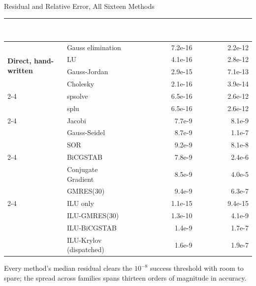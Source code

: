 \documentclass[aspectratio=169,10pt]{beamer}
\newcommand{\hdrow}{\rowcolor{LSnavy}}
\newcommand{\hdtxt}[1]{\textcolor{white}{\bfseries #1}}
\begin{document}
\begin{frame}{Residual and Relative Error, All Sixteen Methods}
  \begin{center}
  \tiny
  \renewcommand{\arraystretch}{0.98}
  \setlength{\tabcolsep}{4pt}
  \begin{tabular}{@{}p{1.85cm}p{2.55cm}rr@{}}
    \toprule
    \hdrow \hdtxt{Family} & \hdtxt{Method} & \hdtxt{Median rel.\ residual} & \hdtxt{Median rel.\ error}\\
    \midrule
    \multirow{4}{1.85cm}{\raggedright\bfseries\color{LSnavy}Direct, hand-written}
      & Gauss elimination & 7.2e-16 & 2.2e-12\\
      & LU & 4.1e-16 & 2.8e-12\\
      & Gauss-Jordan & 2.9e-15 & 7.1e-13\\
      & Cholesky & 2.1e-16 & 3.9e-14\\
    \cmidrule(lr){2-4}
    \multirow{2}{1.85cm}{\raggedright\bfseries\color{LSnavy}Direct, library}
      & spsolve & 6.5e-16 & 2.6e-12\\
      & splu & 6.5e-16 & 2.6e-12\\
    \cmidrule(lr){2-4}
    \multirow{3}{1.85cm}{\raggedright\bfseries\color{LSnavy}Stationary}
      & Jacobi & 7.7e-9 & 8.1e-9\\
      & Gauss-Seidel & 8.7e-9 & 1.1e-7\\
      & SOR & 9.2e-9 & 8.1e-8\\
    \cmidrule(lr){2-4}
    \multirow{3}{1.85cm}{\raggedright\bfseries\color{LSnavy}Krylov}
      & BiCGSTAB & 7.8e-9 & 2.4e-6\\
      & Conjugate Gradient & 8.5e-9 & 4.0e-5\\
      & GMRES(30) & 9.4e-9 & 6.3e-7\\
    \cmidrule(lr){2-4}
    \multirow{4}{1.85cm}{\raggedright\bfseries\color{LSnavy}Preconditioned (ILU)}
      & ILU only & 1.1e-15 & 9.4e-15\\
      & ILU-GMRES(30) & 1.3e-10 & 4.1e-9\\
      & ILU-BiCGSTAB & 1.4e-9 & 1.7e-7\\
      & ILU-Krylov (dispatched) & 1.6e-9 & 1.9e-7\\
    \bottomrule
  \end{tabular}
  \end{center}
  \vspace{0.1em}
  \footnotesize\color{LSgray}\centering
  Every method's median residual clears the $10^{-8}$ success threshold with room to
  spare; the spread across families spans thirteen orders of magnitude in accuracy.
\end{frame}
\end{document}
